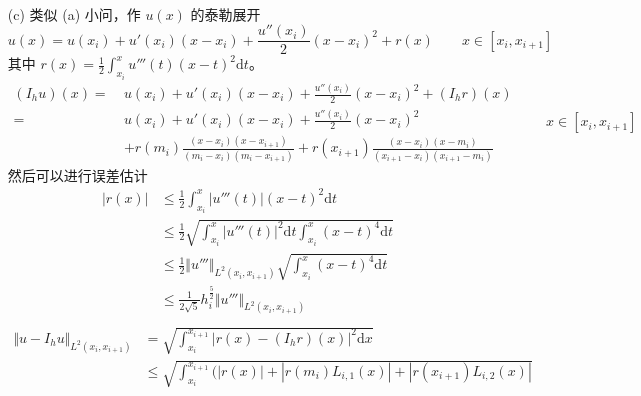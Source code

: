 \documentclass[a4paper]{article}
\begin{document}
\begin{enumerate}
\begin{align}
            \end{align}
    \item[(c)] 类似 (a) 小问，作 $u(x)$ 的泰勒展开
            \begin{equation}
                u(x) = u(x_i) + u'(x_i)(x-x_i) + \frac{u''(x_i)}{2}(x-x_i)^2 + r(x)
                \qquad x\in [x_i, x_{i+1}]
            \end{equation}
            其中 $r(x)=\frac{1}{2}\int_{x_i}^{x}u'''(t)(x-t)^2\text{d}t$。
            \begin{equation}
                \begin{aligned}
                    (I_h u)(x) = \ &u(x_i) + u'(x_i)(x-x_i) + \frac{u''(x_i)}{2}(x-x_i)^2 + (I_h r)(x)\\
                               = \ &u(x_i) + u'(x_i)(x-x_i) + \frac{u''(x_i)}{2}(x-x_i)^2\\ 
                               &+ r(m_i)\frac{(x-x_i)(x-x_{i+1})}{(m_i-x_i)(m_i-x_{i+1})}
                               + r(x_{i+1})\frac{(x-x_i)(x-m_i)}{(x_{i+1}-x_i)(x_{i+1}-m_i)}
                \end{aligned}
                \qquad x\in [x_i, x_{i+1}]
            \end{equation}
            然后可以进行误差估计
            \begin{equation}
                \begin{aligned}
                    |r(x)| &\leq \frac{1}{2}\int_{x_i}^{x}|u'''(t)|(x-t)^2\text{d}t\\
                    &\leq \frac{1}{2} \sqrt{\int_{x_i}^{x}|u'''(t)|^2\text{d}t \int_{x_i}^{x}(x-t)^4\text{d}t}\\
                    &\leq \frac{1}{2} \Vert u''' \Vert_{L^2(x_i,x_{i+1})} \sqrt{\int_{x_i}^{x}(x-t)^4\text{d}t}\\
                    &\leq \frac{1}{2\sqrt{5}} h_i^{\frac{5}{2}} \Vert u''' \Vert_{L^2(x_i,x_{i+1})}\\
                \end{aligned}
            \end{equation}
            \begin{equation}
                \begin{aligned}
                    \Vert u-I_h u \Vert_{L^2(x_i,x_{i+1})}
                    &= \sqrt{\int_{x_i}^{x_{i+1}}|r(x)- (I_h r)(x)|^2\text{d}x}\\
                    &\leq \sqrt{\int_{x_i}^{x_{i+1}}\big(
                        |r(x)| + |r(m_i)L_{i,1}(x)|
                        + |r(x_{i+1})L_{i,2}(x)|
}
\end{aligned}
\end{equation}
\end{enumerate}
\end{document}
